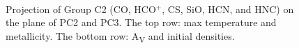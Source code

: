 \documentclass{aa}
\begin{document}
\begin{CJK*}{UTF8}{gbsn}
\begin{figure}[htbp]
\centering
{} 
\\
\caption{Projection of Group C2 (CO, HCO$^+$, CS, SiO, HCN, and HNC) on the plane of PC2 and PC3. The top row: max temperature and metallicity. The bottom row: A\textsubscript{V} and initial densities.}
\label{C2-23}
\end{figure}
   

\end{CJK*}
\end{document}
